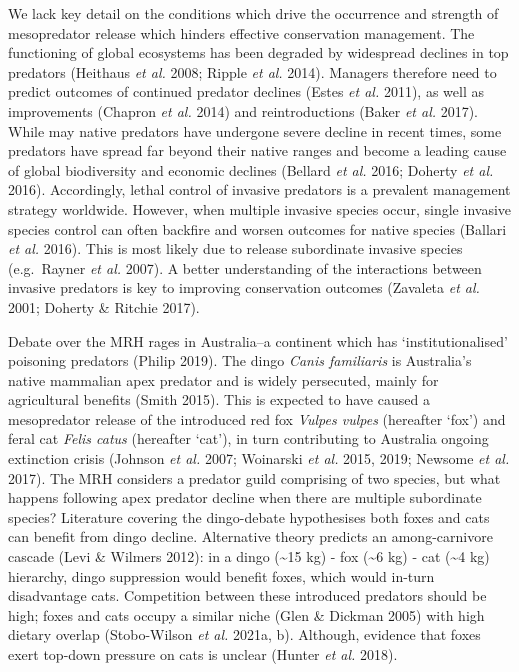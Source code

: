 \documentclass[11pt,a4paper,titlepage,twoside,openright]{style/unimelbthesis}
\begin{document}
\begin{mainmatter}
We lack key detail on the conditions which drive the occurrence and strength of mesopredator release which hinders effective conservation management. The functioning of global ecosystems has been degraded by widespread declines in top predators (Heithaus \emph{et al.} 2008; Ripple \emph{et al.} 2014). Managers therefore need to predict outcomes of continued predator declines (Estes \emph{et al.} 2011), as well as improvements (Chapron \emph{et al.} 2014) and reintroductions (Baker \emph{et al.} 2017). While may native predators have undergone severe decline in recent times, some predators have spread far beyond their native ranges and become a leading cause of global biodiversity and economic declines (Bellard \emph{et al.} 2016; Doherty \emph{et al.} 2016). Accordingly, lethal control of invasive predators is a prevalent management strategy worldwide. However, when multiple invasive species occur, single invasive species control can often backfire and worsen outcomes for native species (Ballari \emph{et al.} 2016). This is most likely due to release subordinate invasive species (e.g.~Rayner \emph{et al.} 2007). A better understanding of the interactions between invasive predators is key to improving conservation outcomes (Zavaleta \emph{et al.} 2001; Doherty \& Ritchie 2017).

Debate over the MRH rages in Australia--a continent which has `institutionalised' poisoning predators (Philip 2019). The dingo \emph{Canis familiaris} is Australia's native mammalian apex predator and is widely persecuted, mainly for agricultural benefits (Smith 2015). This is expected to have caused a mesopredator release of the introduced red fox \emph{Vulpes vulpes} (hereafter `fox') and feral cat \emph{Felis catus} (hereafter `cat'), in turn contributing to Australia ongoing extinction crisis (Johnson \emph{et al.} 2007; Woinarski \emph{et al.} 2015, 2019; Newsome \emph{et al.} 2017). The MRH considers a predator guild comprising of two species, but what happens following apex predator decline when there are multiple subordinate species? Literature covering the dingo-debate hypothesises both foxes and cats can benefit from dingo decline. Alternative theory predicts an among-carnivore cascade (Levi \& Wilmers 2012): in a dingo (\textasciitilde15 kg) - fox (\textasciitilde6 kg) - cat (\textasciitilde4 kg) hierarchy, dingo suppression would benefit foxes, which would in-turn disadvantage cats. Competition between these introduced predators should be high; foxes and cats occupy a similar niche (Glen \& Dickman 2005) with high dietary overlap (Stobo-Wilson \emph{et al.} 2021a, b). Although, evidence that foxes exert top-down pressure on cats is unclear (Hunter \emph{et al.} 2018).


\end{mainmatter}
\end{document}
